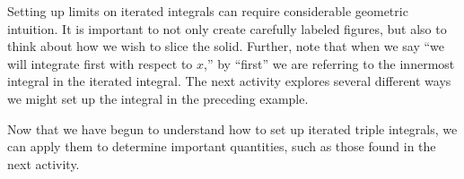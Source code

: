 Setting up limits on iterated integrals can require considerable geometric intuition.  It is important to not only create carefully labeled figures, but also to think about how we wish to slice the solid.  Further, note that when we say ``we will integrate first with respect to $x$,'' by ``first'' we are referring to the innermost integral in the iterated integral.  The next activity explores several different ways we might set up the integral in the preceding example.



%

Now that we have begun to understand how to set up iterated triple integrals, we can apply them to determine important quantities, such as those found in the next activity.



%



